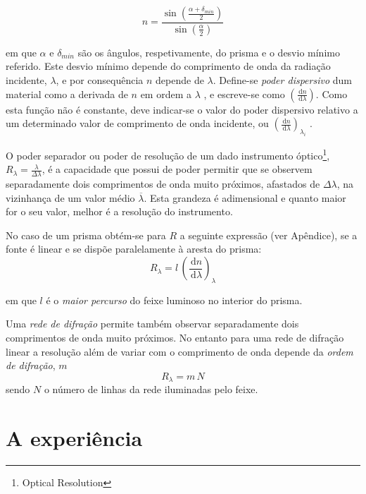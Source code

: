 \documentclass[a4paper,12pt]{article}  %
\newcommand{\ud}{\,\mathrm{d}}
\begin{document}
\begin{equation}
	\label{eq:desviomim}
	n= \frac{\sin \left( \frac{\alpha+ \delta_{min}}{2} \right) } {\sin \left(  \frac{\alpha}{2} \right)}  
\end{equation}

em que $\alpha$ e  $\delta_{min}$ são os ângulos, respetivamente, do prisma e o desvio mínimo referido. Este desvio mínimo depende do comprimento de onda da radiação incidente, $\lambda$, e por consequência $n$ depende de $\lambda$. Define-se \emph{poder dispersivo} dum material como a derivada de $n$ em ordem a $\lambda$ ,  e escreve-se  como $\left( \frac{\ud n}{\ud \lambda } \right)$. Como esta função não é constante, deve indicar-se o valor do poder dispersivo relativo a um determinado valor de comprimento de onda incidente, ou $\left( \frac{\ud n}{\ud \lambda } \right)_{\lambda_i}$ .

O poder separador ou poder de resolução de um dado instrumento óptico\footnote{Optical Resolution}, $R_\lambda = \frac{\lambda}{\Delta \lambda} $,  é a capacidade que possui de poder permitir que se observem separadamente dois comprimentos de onda muito próximos, afastados de $\Delta \lambda$, na vizinhança de um valor médio $\overline{\lambda}$. Esta grandeza é adimensional e quanto maior for o seu valor, melhor é a resolução do instrumento.

No caso de um prisma obtém-se para $R$ a seguinte expressão (ver Apêndice), se a fonte é linear e se dispõe paralelamente à aresta do prisma:
 \begin{equation}
	\label{eq:resolu}
	R_\lambda = l\,\left(\frac{\ud n}{\ud \lambda} \right)_\lambda 
\end{equation}

em que $l$ é o \emph{maior percurso} do feixe luminoso no interior do prisma.

Uma \emph{rede de difração}
permite também observar separadamente dois comprimentos de onda muito próximos.
No entanto para uma rede de difração linear a resolução além de variar com o comprimento de onda depende da \emph{ordem de difração}, $m$
 \begin{equation}
	\label{eq:resoludrifa}
	R_\lambda = m\,N 
\end{equation}
sendo $N$  o número de linhas da rede iluminadas pelo feixe.


\section{\sf A experiência}
\end{document}
